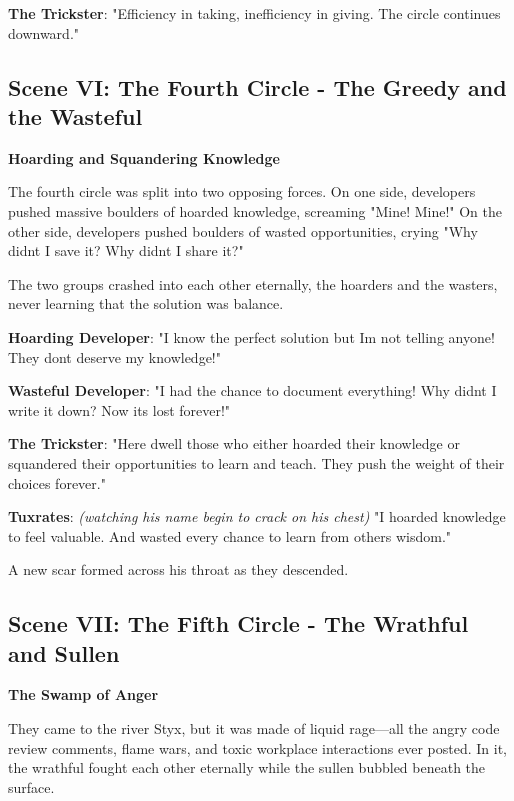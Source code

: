 \textbf{The Trickster}: "Efficiency in taking, inefficiency in giving. The circle continues downward."

\bookdivider

\subsection{Scene VI: The Fourth Circle - The Greedy and the Wasteful}\label{scene-vi-the-fourth-circle---the-greedy-and-the-wasteful}

\textbf{Hoarding and Squandering Knowledge}

The fourth circle was split into two opposing forces. On one side, developers pushed massive boulders of hoarded knowledge, screaming "Mine! Mine!" On the other side, developers pushed boulders of wasted opportunities, crying "Why didn\textquotesingle t I save it? Why didn\textquotesingle t I share it?"

The two groups crashed into each other eternally, the hoarders and the wasters, never learning that the solution was balance.

\textbf{Hoarding Developer}: "I know the perfect solution but I\textquotesingle m not telling anyone! They don\textquotesingle t deserve my knowledge!"

\textbf{Wasteful Developer}: "I had the chance to document everything! Why didn\textquotesingle t I write it down? Now it\textquotesingle s lost forever!"

\textbf{The Trickster}: "Here dwell those who either hoarded their knowledge or squandered their opportunities to learn and teach. They push the weight of their choices forever."

\textbf{Tuxrates}: \emph{(watching his name begin to crack on his chest)} "I hoarded knowledge to feel valuable. And wasted every chance to learn from others\textquotesingle{} wisdom."

A new scar formed across his throat as they descended.

\bookdivider

\subsection{Scene VII: The Fifth Circle - The Wrathful and Sullen}\label{scene-vii-the-fifth-circle---the-wrathful-and-sullen}

\textbf{The Swamp of Anger}

They came to the river Styx, but it was made of liquid rage---all the angry code review comments, flame wars, and toxic workplace interactions ever posted. In it, the wrathful fought each other eternally while the sullen bubbled beneath the surface.

